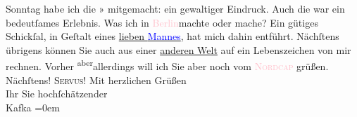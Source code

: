            \pstart
           Sonntag habe ich die »\label{K_L00162_1v}\label{K_L00162_1h} mitgemacht: ein gewaltiger Eindruck.\pend
           \pstart
           Auch die \label{K_L00162_2v}\label{K_L00162_2h} war ein bedeutſames Erlebnis.\pend
           \pstart
           Was ich in \textcolor{pink}{Berlin}{}\ledrightnote{\textcolor{pink}{Berlin}}{ }\introOben{}machte oder\introOben{} mache? Ein gütiges Schickſal, in Geſtalt eines
                  \uline{lieben \textcolor{blue}{Mannes}{}}, hat mich dahin  entführt. Nächſtens {\pb}übrigens können Sie auch aus einer \uline{anderen Welt} auf ein Lebenszeichen von mir rechnen.
               Vorher \substVorne{}\textsuperscript{aber}\substDazwischen{}allerdings\substHinten{} will ich Sie \introOben{}aber\introOben{} noch vom \textcolor{pink}{\textsc{Nordcap}}{}\ledrightnote{\textcolor{pink}{Nordkap}} grüßen. Nächſtens!\pend
           \pstart
           \textsc{Servus}! Mit herzlichen Grüßen{\\[\baselineskip]}Ihr Sie hochſchätzender{\\[\baselineskip]}\spacefill\mbox{Kafka}\pend
           \leftskip=0em{}\endnumbering{}  
      